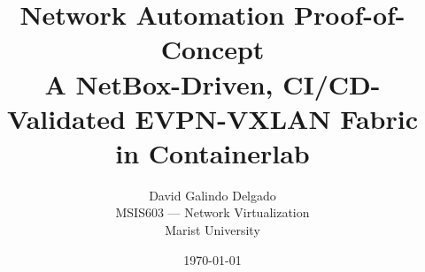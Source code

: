 \documentclass[11pt, letterpaper]{article}
\title{
    \vspace{-1.5cm}
    \LARGE Network Automation Proof-of-Concept \\[0.3em]
    \large A NetBox-Driven, CI/CD-Validated EVPN-VXLAN Fabric \\[0.3em]
    \large in Containerlab
}
\author{
    David Galindo Delgado \\
    \small MSIS603 --- Network Virtualization \\
    \small Marist University
}
\date{\today}
\begin{document}
\maketitle

\begin{abstract}
    
\end{abstract}

\thispagestyle{fancy}

\tableofcontents
\newpage
\end{document}
